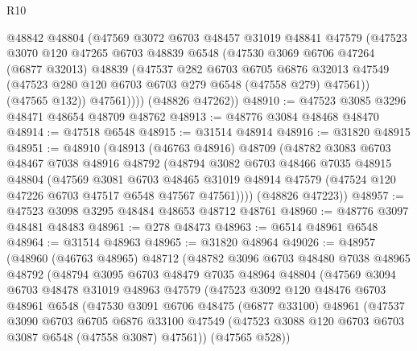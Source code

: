 \begin{lexlean}{R10}
\begin{coremodule}
          @48842
          @48804
          (@47569
            @3072
            @6703
            @48457
            @31019
            @48841
            @47579
            (@47523
              @3070
              @120
              @47265
              @6703
              @48839
              @6548
              (@47530
                @3069
                @6706
                @47264
                (@6877 @32013)
                @48839
                (@47537
                  @282
                  @6703
                  @6705
                  @6876
                  @32013
                  @47549
                  (@47523 @280 @120 @6703 @6703 @279 @6548 (@47558 @279) @47561))
                (@47565 @132))
              @47561))))
      (@48826 @47262))
@48910 := @47523 @3085 @3296 @48471 @48654 @48709 @48762
@48913 := @48776 @3084 @48468 @48470
@48914 := @47518 @6548
@48915 := @31514 @48914
@48916 := @31820 @48915
@48951 := @48910
    (@48913
      (@46763 @48916)
      @48709
      (@48782
        @3083
        @6703
        @48467
        @7038
        @48916
        @48792
        (@48794
          @3082
          @6703
          @48466
          @7035
          @48915
          @48804
          (@47569
            @3081
            @6703
            @48465
            @31019
            @48914
            @47579
            (@47524 @120 @47226 @6703 @47517 @6548 @47567 @47561))))
      (@48826 @47223))
@48957 := @47523 @3098 @3295 @48484 @48653 @48712 @48761
@48960 := @48776 @3097 @48481 @48483
@48961 := @278 @48473
@48963 := @6514 @48961 @6548
@48964 := @31514 @48963
@48965 := @31820 @48964
@49026 := @48957
    (@48960
      (@46763 @48965)
      @48712
      (@48782
        @3096
        @6703
        @48480
        @7038
        @48965
        @48792
        (@48794
          @3095
          @6703
          @48479
          @7035
          @48964
          @48804
          (@47569
            @3094
            @6703
            @48478
            @31019
            @48963
            @47579
            (@47523
              @3092
              @120
              @48476
              @6703
              @48961
              @6548
              (@47530
                @3091
                @6706
                @48475
                (@6877 @33100)
                @48961
                (@47537
                  @3090
                  @6703
                  @6705
                  @6876
                  @33100
                  @47549
                  (@47523 @3088 @120 @6703 @6703 @3087 @6548 (@47558 @3087) @47561))
                (@47565 @528))

\end{coremodule}
\end{lexlean}
